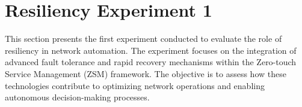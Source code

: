 
\section{Resiliency Experiment 1}\label{res:1}
This section presents the first experiment conducted to evaluate the role of resiliency in network automation. The experiment focuses on the integration of advanced fault tolerance and rapid recovery mechanisms within the Zero-touch Service Management (ZSM) framework. The objective is to assess how these technologies contribute to optimizing network operations and enabling autonomous decision-making processes.